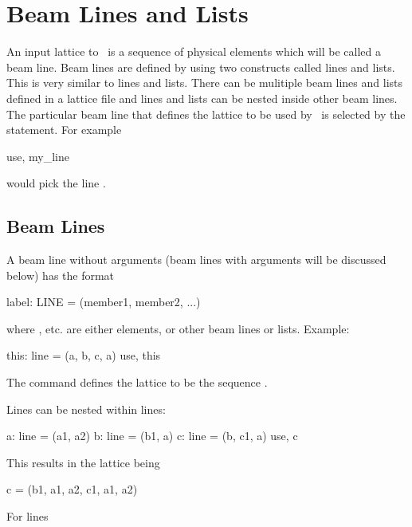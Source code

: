 \chapter{Beam Lines and Lists}

An input lattice to \bmad\ is a sequence of physical elements which
will be called a beam line. Beam lines are defined by using two
constructs called lines and lists. This is very similar to \mad lines
and lists. There can be mulitiple beam lines and lists defined in a
lattice file and lines and lists can be nested inside other beam
lines. The particular beam line that defines the lattice to be used by
\bmad\ is selected by the  statement. For example
\begin{example}
  use, my_line
\end{example}
would pick the line .

\section{Beam Lines}
A beam line without arguments (beam lines with arguments will be
discussed below) has the format
\begin{example}
  label: LINE = (member1, member2, ...)
\end{example}
where , etc. are either elements, or other beam lines or lists.
Example:
\begin{example}
  this: line = (a, b, c, a)
  use, this
\end{example}
The  command defines the lattice to be the sequence .

Lines can be nested within lines:
\begin{example}
  a: line = (a1, a2)
  b: line = (b1, a)
  c: line = (b, c1, a)
  use, c
\end{example}
This results in the lattice being
\begin{example}
  c = (b1, a1, a2, c1, a1, a2)
\end{example}

For lines

